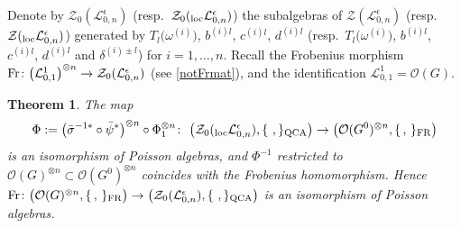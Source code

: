 \documentclass[pdftex]{sigma}%
\numberwithin{equation}{section}
\numberwithin{figure}{section}
\newtheorem{teo}{Theorem}[section]
\newcommand{\Ll}{{\mathcal L}}
\newcommand{\ra}{\rightarrow}
\begin{document}
Denote by $\mathcal{Z}_0(\Ll_{0,n}^\epsilon)$ (resp.~$\mathcal{Z}_0({}_{\rm loc}\Ll_{0,n}^\epsilon)$) the subalgebras of $\mathcal{Z}(\Ll_{0,n}^\epsilon)$ \big(resp.~$\mathcal{Z}({}_{\rm loc}\Ll_{0,n}^\epsilon)$\big) generated by $T_l\big(\omega^{(i)}\big)$, $b^{(i)l}$, $c^{(i)l}$, $d^{(i) l}$ \big(resp.~$T_l\big(\omega^{(i)}\big)$, $b^{(i)l}$, $c^{(i)l}$, $d^{(i) l}$ and $\delta^{(i) \pm l}$\big) for $i =1,\dots, n$.
Recall the Frobenius morphism ${\rm Fr}\colon \big(\Ll_{0,1}^1\big)^{\otimes n}\rightarrow \mathcal{Z}_0(\Ll_{0,n}^\epsilon)$ (see \eqref{notFrmat}), and the identification $\Ll_{0,1}^1=\mathcal{O}(G)$.

\begin{teo}\label{scteo} The map
\[
\Phi := \big(\bar \sigma^{-1*}\circ \bar{\psi}^*{}\big)^{\otimes n}\circ \Phi_1^{\otimes n}\colon\ \big(\mathcal{Z}_0({}_{\rm loc}\Ll_{0,n}^\epsilon),\{\ ,\}_{\rm QCA}\big)\ra \big(\mathcal{O}(G^0)^{\otimes n},\{\, ,\, \}_{\rm FR}\big)
\]
is an isomorphism of Poisson algebras, and $\Phi^{-1}$ restricted to $\mathcal{O}(G)^{\otimes n}\subset \mathcal{O}(G^0)^{\otimes n}$ coincides with the Frobenius homomorphism. Hence ${\rm Fr} \colon \big(\mathcal{O}(G)^{\otimes n},\{\, ,\, \}_{\rm FR}\big) \ra \big(\mathcal{Z}_0(\Ll_{0,n}^\epsilon),\{\ ,\}_{\rm QCA}\big)$ is an isomorphism of Poisson algebras.
\end{teo}
\end{document}
